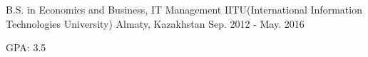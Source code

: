 

\begin{cventries}

  \cventry
    {B.S. in Economics and Business, IT Management } %
    {IITU(International Information Technologies University)} %
    {Almaty, Kazakhstan} %
    {Sep. 2012 - May. 2016} %
    {
      \begin{cvitems} %
        \item {GPA: 3.5}
      \end{cvitems}
    }

\end{cventries}
